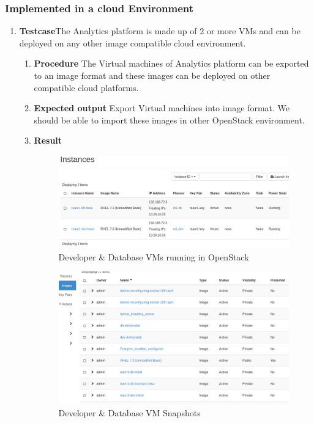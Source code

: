 \subsubsection{Implemented in a cloud Environment}
\begin{enumerate}
\item \textbf{Testcase}\newline The Analytics platform is made up of 2
  or more VMs and can be deployed on any other image compatible cloud environment.
  \begin{enumerate}
  \item \textbf{Procedure}\newline
    The Virtual machines of Analytics platform can be exported to an
    image format and these images can be deployed on other compatible cloud platforms.
  \item \textbf{Expected output}\newline
    Export Virtual machines into image format. We should be able to
    import these images in other OpenStack environment.
  \item \textbf{Result}\newline
    \begin{figure}[H]
      \centering
      \includegraphics[scale=0.35]{screenshots/devanddbvm.png}
      \caption{Developer \& Database VMs running in OpenStack}
      \label{devanddbvm}
    \end{figure}

    \begin{figure}[H]
      \centering
      \includegraphics[scale=0.35]{screenshots/devanddbvm-snapshots.png}
      \caption{Developer \& Database VM Snapshots}
      \label{devanddbvm-snapshots}
    \end{figure}
  \end{enumerate}
\end{enumerate}



